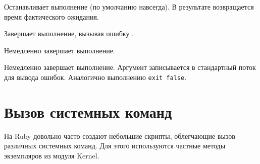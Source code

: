 \begin{methodlist}
  Останавливает выполнение (по умолчанию навсегда). В результате возвращается время фактического ожидания.

  Завершает выполнение, вызывая ошибку . 

  Немедленно завершает выполнение.

  Немедленно завершает выполнение. Аргумент записывается в стандартный поток для вывода ошибок. Аналогично выполнению \verb!exit false!.
\end{methodlist}

\section{Вызов системных команд}

На Ruby довольно часто создают небольшие скрипты, облегчающие вызов различных системных команд. Для этого используются частные методы экземпляров из модуля Kernel.

